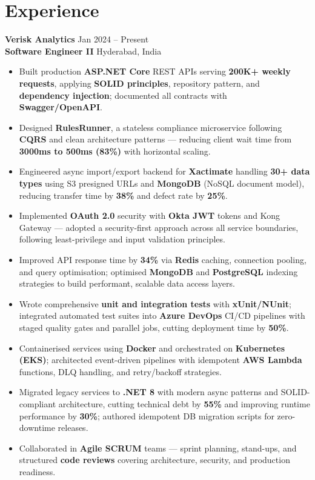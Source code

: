 \documentclass[letterpaper,10pt]{article}
\begin{document}
\section*{Experience}

\textbf{Verisk Analytics} \hfill Jan 2024 -- Present \\
\textbf{Software Engineer II} \hfill Hyderabad, India

\begin{itemize}[leftmargin=*]
    \item Built production \textbf{ASP.NET Core} REST APIs serving \textbf{200K+ weekly requests}, applying \textbf{SOLID principles}, repository pattern, and \textbf{dependency injection}; documented all contracts with \textbf{Swagger/OpenAPI}.
    \item Designed \textbf{RulesRunner}, a stateless compliance microservice following \textbf{CQRS} and clean architecture patterns — reducing client wait time from \textbf{3000ms to 500ms (83\%)} with horizontal scaling.
    \item Engineered async import/export backend for \textbf{Xactimate} handling \textbf{30+ data types} using S3 presigned URLs and \textbf{MongoDB} (NoSQL document model), reducing transfer time by \textbf{38\%} and defect rate by \textbf{25\%}.
    \item Implemented \textbf{OAuth 2.0} security with \textbf{Okta JWT} tokens and Kong Gateway — adopted a security-first approach across all service boundaries, following least-privilege and input validation principles.
    \item Improved API response time by \textbf{34\%} via \textbf{Redis} caching, connection pooling, and query optimisation; optimised \textbf{MongoDB} and \textbf{PostgreSQL} indexing strategies to build performant, scalable data access layers.
    \item Wrote comprehensive \textbf{unit and integration tests} with \textbf{xUnit/NUnit}; integrated automated test suites into \textbf{Azure DevOps} CI/CD pipelines with staged quality gates and parallel jobs, cutting deployment time by \textbf{50\%}.
    \item Containerised services using \textbf{Docker} and orchestrated on \textbf{Kubernetes (EKS)}; architected event-driven pipelines with idempotent \textbf{AWS Lambda} functions, DLQ handling, and retry/backoff strategies.
    \item Migrated legacy services to \textbf{.NET 8} with modern async patterns and SOLID-compliant architecture, cutting technical debt by \textbf{55\%} and improving runtime performance by \textbf{30\%}; authored idempotent DB migration scripts for zero-downtime releases.
    \item Collaborated in \textbf{Agile SCRUM} teams — sprint planning, stand-ups, and structured \textbf{code reviews} covering architecture, security, and production readiness.
\end{itemize}
\end{document}
